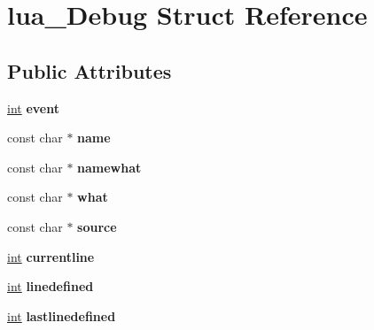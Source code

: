 \hypertarget{structlua___debug}{}\section{lua\+\_\+\+Debug Struct Reference}
\label{structlua___debug}
\subsection*{Public Attributes}
\begin{DoxyCompactItemize}
\item 
\hypertarget{structlua___debug_a6578d385d2322429a0fe87b79f1ddec0}{}\hyperlink{_s_d_l__thread_8h_a6a64f9be4433e4de6e2f2f548cf3c08e}{int} {\bfseries event}\label{structlua___debug_a6578d385d2322429a0fe87b79f1ddec0}

\item 
\hypertarget{structlua___debug_a2978ab7f2ade479a003beb16d3b7a993}{}const char $\ast$ {\bfseries name}\label{structlua___debug_a2978ab7f2ade479a003beb16d3b7a993}

\item 
\hypertarget{structlua___debug_a7e8c201950ea4dd3f2c7df9e1201019a}{}const char $\ast$ {\bfseries namewhat}\label{structlua___debug_a7e8c201950ea4dd3f2c7df9e1201019a}

\item 
\hypertarget{structlua___debug_afbf8df5f26e9c345378a7eb402eed081}{}const char $\ast$ {\bfseries what}\label{structlua___debug_afbf8df5f26e9c345378a7eb402eed081}

\item 
\hypertarget{structlua___debug_a422bceba8605d96bce4d19ce801a62e4}{}const char $\ast$ {\bfseries source}\label{structlua___debug_a422bceba8605d96bce4d19ce801a62e4}

\item 
\hypertarget{structlua___debug_a97b3ed36cdfdc6f2c694b253a3d96da6}{}\hyperlink{_s_d_l__thread_8h_a6a64f9be4433e4de6e2f2f548cf3c08e}{int} {\bfseries currentline}\label{structlua___debug_a97b3ed36cdfdc6f2c694b253a3d96da6}

\item 
\hypertarget{structlua___debug_a97cb69b18daa46d20fb1a13eec78661b}{}\hyperlink{_s_d_l__thread_8h_a6a64f9be4433e4de6e2f2f548cf3c08e}{int} {\bfseries linedefined}\label{structlua___debug_a97cb69b18daa46d20fb1a13eec78661b}

\item 
\hypertarget{structlua___debug_a4c69b9d30e54cf9071cd2987ede128eb}{}\hyperlink{_s_d_l__thread_8h_a6a64f9be4433e4de6e2f2f548cf3c08e}{int} {\bfseries lastlinedefined}\label{structlua___debug_a4c69b9d30e54cf9071cd2987ede128eb}


\end{DoxyCompactItemize}
